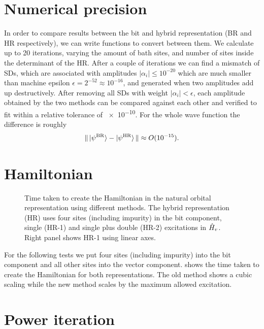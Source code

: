 \section{Numerical precision}

In order to compare results between the bit and hybrid representation
(BR and HR respectively),
we can write functions to convert between them.
We calculate up to 20 iterations, varying the amount of bath sites,
and number of sites inside the determinant of the HR.
After a couple of iterations we can find a mismatch of SDs,
which are associated with amplitudes
$|\alpha_i| \leq 10^{-20}$ which are much smaller than
machine epsilon $\epsilon = 2^{-52} \approx 10^{-16}$,
and generated when two amplitudes add up destructively.
After removing all SDs with weight $|\alpha_i| < \epsilon$,
each amplitude obtained by the two methods can be compared against each other
and verified to fit within a relative tolerance of \num{e-10}.
For the whole wave function the difference is roughly
\begin{equation}
    \|\ket{\psi^\mathrm{BR}} - \ket{\psi^\mathrm{HR}}\|
    \approx O(10^{-15}).
\end{equation}

\section{Hamiltonian}

\begin{figure}[ht]
    \centering
    
    \caption{
        Time taken to create the Hamiltonian
        in the natural orbital representation
        using different methods.
        The hybrid representation (HR) uses four sites (including impurity)
        in the bit component,
        single (HR-1) and single plus double (HR-2) excitations in $\hat{H}_v$.
        Right panel shows HR-1 using linear axes.
    }
    \label{fig:hamiltonian-creation}
\end{figure}

For the following tests we put four sites (including impurity) into the
bit component and all other sites into the vector component.
 shows the time taken to create the Hamiltonian
for both representations.
The old method shows a cubic scaling while
the new method scales by the maximum allowed excitation.

\section{Power iteration}

